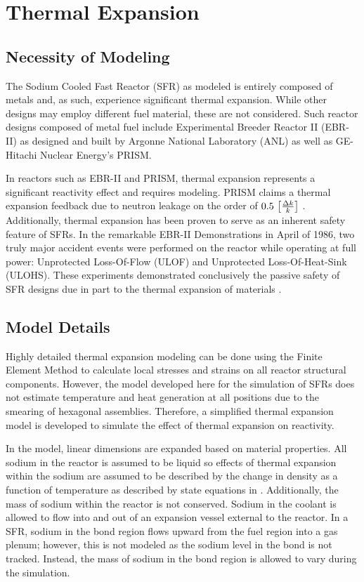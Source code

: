 \chapter{Thermal Expansion}
\label{ch:thermalExpansion}

\section{Necessity of Modeling}
  The Sodium Cooled Fast Reactor (SFR) as modeled is entirely composed of
  metals and, as such, experience significant thermal expansion. While other 
  designs may employ different fuel material, these are not considered. Such
  reactor designs composed of metal fuel include Experimental Breeder Reactor II
  (EBR-II) as designed and built by Argonne National Laboratory (ANL) as well as
  GE-Hitachi Nuclear Energy's PRISM. 

  In reactors such as EBR-II and PRISM, thermal expansion represents a
  significant reactivity effect and requires modeling. PRISM claims a thermal
  expansion feedback due to neutron leakage on the order of $0.5
  \,\left[\text{{$\frac{\Delta k}{k}$}}\right]$ \cite{GEFR793}. Additionally, thermal
  expansion has been proven to serve as an inherent safety feature of SFRs. In
  the remarkable EBR-II Demonstrations in April of 1986, two truly major
  accident events were performed on the reactor while operating at full power:
  Unprotected Loss-Of-Flow (ULOF) and Unprotected Loss-Of-Heat-Sink (ULOHS).
  These experiments demonstrated conclusively the passive safety of SFR designs
  due in part to the thermal expansion of materials \cite{PlentifulEnergy}.

\section{Model Details}
  \label{sec:model_details}
  Highly detailed thermal expansion modeling can be done using the Finite
  Element Method to calculate local stresses and strains on all reactor
  structural components. However, the model developed here for the simulation of
  SFRs does not estimate temperature and heat generation at all positions due to
  the smearing of hexagonal assemblies. Therefore, a simplified thermal
  expansion model is developed to simulate the effect of thermal expansion on
  reactivity.

  In the model, linear dimensions are expanded based on material properties.
  All sodium in the reactor is assumed to be liquid so effects of thermal
  expansion within the sodium are assumed to be described by the change in
  density as a function of temperature as described by state equations in
  \cite{sodiumProp}. Additionally, the mass of sodium within the reactor is not
  conserved. Sodium in the coolant is allowed to flow into and out of an
  expansion vessel external to the reactor. In a SFR, sodium in the bond region
  flows upward from the fuel region into a gas plenum; however, this is not
  modeled as the sodium level in the bond is not tracked. Instead, the mass of
  sodium in the bond region is allowed to vary during the simulation.

